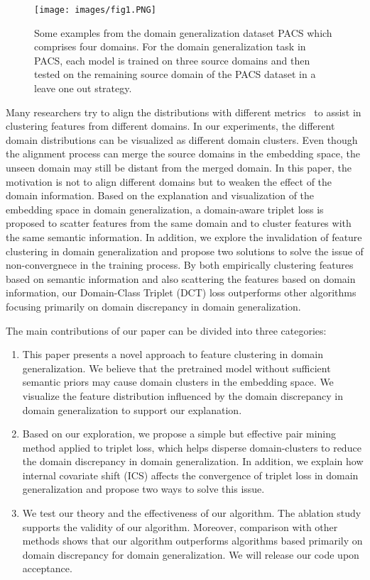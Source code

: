 \documentclass[a4paper,fleqn]{cas-dc}
\begin{document}
\begin{figure}
\centering 
\texttt{[image: images/fig1.PNG]} 
\caption{Some examples from the domain generalization dataset PACS\cite{PACS} which comprises four domains. For the domain generalization task in PACS, each model is trained on three source domains and then tested on the remaining source domain of the PACS dataset in a leave one out strategy.} 
\label{Fig1} 
\end{figure}
Many researchers try to align the distributions with different metrics~\cite{CDT, MSL} to assist in clustering features from different domains. In our experiments, the different domain distributions can be visualized as different domain clusters. Even though the alignment process can merge the source domains in the embedding space, the unseen domain may still be distant from the merged domain.  In this paper, the motivation is not to align different domains but to weaken the effect of the domain information. Based on the explanation and visualization of the embedding space in domain generalization, a domain-aware triplet loss is proposed to scatter features from the same domain and to cluster features with the same semantic information. In addition, we explore the invalidation of feature clustering in domain generalization and propose two solutions to solve the issue of non-convergnece in the training process.  By both empirically clustering features based on semantic information and also scattering the features based on domain information, our Domain-Class Triplet (DCT) loss outperforms other algorithms focusing primarily on domain discrepancy in domain generalization. \par
 The main contributions of our paper can be divided into three categories:
\begin{enumerate}
    \item This paper presents a novel approach to feature clustering in domain generalization. We believe that the pretrained model without sufficient semantic priors may cause domain clusters in the embedding space. We visualize the feature distribution influenced by the domain discrepancy in domain generalization to support our explanation.  
    \item Based on our exploration, we propose a simple but effective pair mining method applied to triplet loss, which helps disperse domain-clusters  to reduce the domain discrepancy in domain generalization. In addition, we explain how internal covariate shift (ICS) affects the convergence of triplet loss in domain generalization and propose two ways to solve this issue.
    \item We test our theory and the effectiveness of our algorithm. The ablation study supports the validity of our algorithm. Moreover, comparison with other methods shows that our algorithm outperforms algorithms based primarily on domain discrepancy for domain generalization.  We will release our code upon acceptance.
\end{enumerate}
\end{document}
